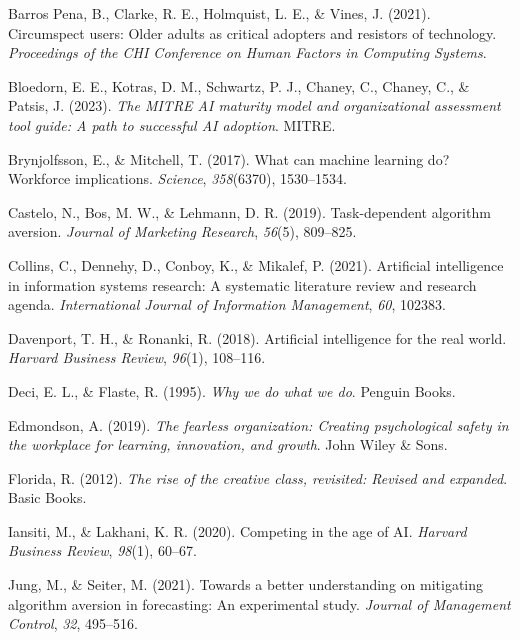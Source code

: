 \documentclass[
]{article}
\newlength{\cslhangindent}
\newenvironment{CSLReferences}[2] %
 {\begin{list}{}{%
  \setlength{\itemindent}{0pt}
  \setlength{\leftmargin}{0pt}
  \setlength{\parsep}{0pt}
  \ifodd #1
   \setlength{\leftmargin}{\cslhangindent}
   \setlength{\itemindent}{-1\cslhangindent}
  \fi
  \setlength{\itemsep}{#2\baselineskip}}}
 {\end{list}}
\begin{document}
\label{refs}
\begin{CSLReferences}{1}{0}
Barros Pena, B., Clarke, R. E., Holmquist, L. E., \& Vines, J. (2021).
Circumspect users: Older adults as critical adopters and resistors of
technology. \emph{Proceedings of the CHI Conference on Human Factors in
Computing Systems}.

Bloedorn, E. E., Kotras, D. M., Schwartz, P. J., Chaney, C., Chaney, C.,
\& Patsis, J. (2023). \emph{The MITRE AI maturity model and
organizational assessment tool guide: A path to successful AI adoption}.
MITRE.

Brynjolfsson, E., \& Mitchell, T. (2017). What can machine learning do?
Workforce implications. \emph{Science}, \emph{358}(6370), 1530--1534.

Castelo, N., Bos, M. W., \& Lehmann, D. R. (2019). Task-dependent
algorithm aversion. \emph{Journal of Marketing Research}, \emph{56}(5),
809--825.

Collins, C., Dennehy, D., Conboy, K., \& Mikalef, P. (2021). Artificial
intelligence in information systems research: A systematic literature
review and research agenda. \emph{International Journal of Information
Management}, \emph{60}, 102383.

Davenport, T. H., \& Ronanki, R. (2018). Artificial intelligence for the
real world. \emph{Harvard Business Review}, \emph{96}(1), 108--116.

Deci, E. L., \& Flaste, R. (1995). \emph{Why we do what we do}. Penguin
Books.

Edmondson, A. (2019). \emph{The fearless organization: Creating
psychological safety in the workplace for learning, innovation, and
growth}. John Wiley \& Sons.

Florida, R. (2012). \emph{The rise of the creative class, revisited:
Revised and expanded}. Basic Books.

Iansiti, M., \& Lakhani, K. R. (2020). Competing in the age of AI.
\emph{Harvard Business Review}, \emph{98}(1), 60--67.

Jung, M., \& Seiter, M. (2021). Towards a better understanding on
mitigating algorithm aversion in forecasting: An experimental study.
\emph{Journal of Management Control}, \emph{32}, 495--516.


\end{CSLReferences}
\end{document}
